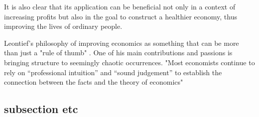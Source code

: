 \documentclass[12pt,a4paper]{scrartcl}
\begin{document}
	It is also clear that its application can be beneficial not only in a context of increasing profits but also in the goal to construct a healthier economy, thus improving the lives of ordinary people.
	
	
	
	Leontief's philosophy of improving economics as something that can be more than just a "rule of thumb" \cite[p.~36]{leontief1960niedergang}.
	One of his main contributions and passions is bringing structure to seemingly chaotic occurrences. 	"Most economists continue to rely on “professional intuition” and “sound judgement” to establish the connection between the facts and the theory of economics" \cite[p.~13]{leontief1951input}
	





	
	
	
	\subsection{subsection etc}
	
		
	\listoftodos

	
	
\end{document}
